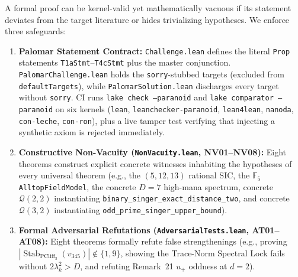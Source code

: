 \documentclass[11pt,letterpaper]{article}
\theoremstyle{plain}
\theoremstyle{definition}
\theoremstyle{remark}
\newcommand{\F}{\mathbb{F}}
\newcommand{\Stab}{\operatorname{Stab}}
\newcommand{\PCliff}{\mathrm{PCliff}}
\newcommand{\Qcode}{\mathcal{Q}}
\newcommand{\leanref}[1]{\textnormal{\texttt{\footnotesize #1}}}
\begin{document}
A formal proof can be kernel-valid yet mathematically vacuous if its statement deviates from the target literature or hides trivializing hypotheses. We enforce three safeguards:
\begin{enumerate}[leftmargin=2em,itemsep=2pt]
  \item \textbf{Palomar Statement Contract:} \texttt{Challenge.lean} defines the literal \texttt{Prop} statements \texttt{T1aStmt}--\texttt{T4cStmt} plus the master conjunction. \texttt{PalomarChallenge.lean} holds the \texttt{sorry}-stubbed targets (excluded from \texttt{defaultTargets}), while \texttt{PalomarSolution.lean} discharges every target without \texttt{sorry}. CI runs \texttt{lake check --paranoid} and \texttt{lake comparator --paranoid} on six kernels (\texttt{lean}, \texttt{leanchecker-paranoid}, \texttt{lean4lean}, \texttt{nanoda}, \texttt{con-leche}, \texttt{con-ron}), plus a live tamper test verifying that injecting a synthetic axiom is rejected immediately.
  \item \textbf{Constructive Non-Vacuity (\texttt{NonVacuity.lean}, NV01--NV08):} Eight theorems construct explicit concrete witnesses inhabiting the hypotheses of every universal theorem (e.g., the $(5,12,13)$ rational SIC, the $\F_5$ \texttt{AlltopFieldModel}, the concrete $D=7$ high-mana spectrum, concrete $\Qcode(2,2)$ instantiating \leanref{binary\_singer\_exact\_distance\_two}, and concrete $\Qcode(3,2)$ instantiating \leanref{odd\_prime\_singer\_upper\_bound}).
  \item \textbf{Formal Adversarial Refutations (\texttt{AdversarialTests.lean}, AT01--AT08):} Eight theorems formally refute false strengthenings (e.g., proving $|\Stab_{\PCliff_3}(v_{345})|\notin\{1,9\}$, showing the Trace-Norm Spectral Lock fails without $2\lambda_k^2>D$, and refuting Remark~21 $u_+$ oddness at $d=2$).
\end{enumerate}
\end{document}
